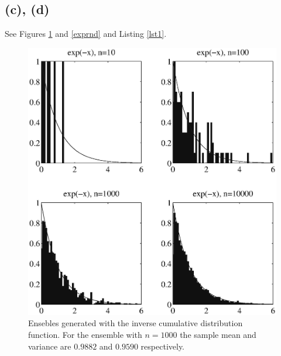 \documentclass[fleqn, letterpaper]{tufte-handout}
\begin{document}
\subsection{(c), (d)}
See Figures \ref{rand} and \ref{exprnd} and Listing \ref{lst1}. \\
\begin{figure}
    \includegraphics[width=\textwidth]{problem1}
    \caption{Ensebles generated with the inverse cumulative distribution function.
    For the ensemble with $n=1000$ the sample mean and variance are $0.9882$ and $0.9590$ respectively.}
    \label{rand}
\end{figure}
\end{document}
